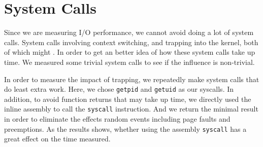 \section{System Calls}

Since we are measuring I/O performance, we cannot avoid doing a lot of system calls. System calls involving context switching, and trapping into the kernel, both of which might . In order to get an better idea of how these system calls take up time. We measured some trivial system calls to see if the influence is non-trivial.

In order to measure the impact of trapping, we repeatedly make system calls that do least extra work. Here, we chose \texttt{getpid} and \texttt{getuid} as our syscalls. In addition, to avoid function returns that may take up time, we directly used the inline assembly to call the \texttt{syscall} instruction. And we return the minimal result in order to eliminate the effects random events including page faults and preemptions. As the results shows, whether using the assembly \texttt{syscall} has a great effect on the time measured.